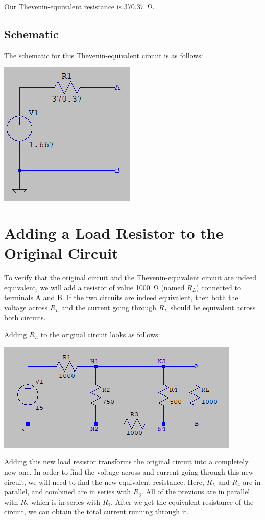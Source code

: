 \documentclass{article}
\begin{document}
Our Thevenin-equivalent resistance is \SI{370.37}{\ohm}.

\pagebreak

\subsection{Schematic} The schematic for this Thevenin-equivalent
circuit is as follows:

\includegraphics{Images/Thevenin.png}

\section{Adding a Load Resistor to the Original Circuit} To
verify that the original circuit and the Thevenin-equivalent
circuit are indeed equivalent, we will add a resistor of
value \SI{1000}{\ohm} (named \(R_L\)) connected to
terminals A and B. If the two circuits are indeed equivalent,
then both the voltage across \(R_L\) and the current going
through \(R_L\) should be equivalent across both circuits.

Adding \(R_L\) to the original circuit looks as follows:

\includegraphics{Images/circuit0_RL.png}

Adding this new load resistor
transforms the original circuit into a completely new one.
In order to find the voltage across and current going through
this new circuit, we will need to find the new equivalent
resistance. Here, \(R_L\) and \(R_4\) are in parallel, and
combined are in series with \(R_3\). All of the previous
are in parallel with \(R_2\) which is in series with \(R_1\).
After we get the equivalent resistance of the circuit,
we can obtain the total current running through it.
\end{document}

